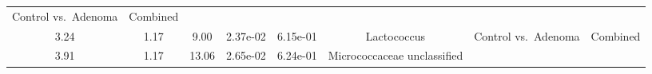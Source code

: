 \documentclass[12pt,]{article}
\begin{document}
\begin{longtable}[]{@{}cccccccc@{}}
\begin{minipage}[t]{0.14\columnwidth}
Control vs.~Adenoma\strut
\end{minipage} & \begin{minipage}[t]{0.09\columnwidth}\centering\strut
Combined\strut
\end{minipage}\tabularnewline
\begin{minipage}[t]{0.05\columnwidth}\centering\strut
3.24\strut
\end{minipage} & \begin{minipage}[t]{0.09\columnwidth}\centering\strut
1.17\strut
\end{minipage} & \begin{minipage}[t]{0.09\columnwidth}\centering\strut
9.00\strut
\end{minipage} & \begin{minipage}[t]{0.07\columnwidth}\centering\strut
2.37e-02\strut
\end{minipage} & \begin{minipage}[t]{0.07\columnwidth}\centering\strut
6.15e-01\strut
\end{minipage} & \begin{minipage}[t]{0.20\columnwidth}\centering\strut
Lactococcus\strut
\end{minipage} & \begin{minipage}[t]{0.14\columnwidth}\centering\strut
Control vs.~Adenoma\strut
\end{minipage} & \begin{minipage}[t]{0.09\columnwidth}\centering\strut
Combined\strut
\end{minipage}\tabularnewline
\begin{minipage}[t]{0.05\columnwidth}\centering\strut
3.91\strut
\end{minipage} & \begin{minipage}[t]{0.09\columnwidth}\centering\strut
1.17\strut
\end{minipage} & \begin{minipage}[t]{0.09\columnwidth}\centering\strut
13.06\strut
\end{minipage} & \begin{minipage}[t]{0.07\columnwidth}\centering\strut
2.65e-02\strut
\end{minipage} & \begin{minipage}[t]{0.07\columnwidth}\centering\strut
6.24e-01\strut
\end{minipage} & \begin{minipage}[t]{0.20\columnwidth}\centering\strut
Micrococcaceae unclassified\strut
\end{minipage} & \begin{minipage}[t]{0.14\columnwidth}\centering\strut

\end{minipage}
\end{longtable}
\end{document}
